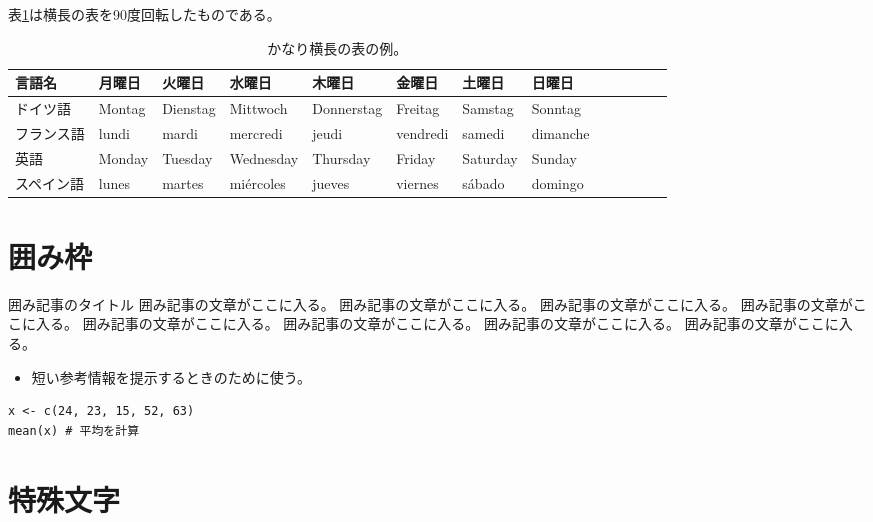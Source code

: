 \documentclass[ %
  uplatex,%
  a5paper,%
  papersize%
]{jsbook}
\newcommand{\sanko}[1]{%
  \begin{itemize}
    \item[\mysbox{\small\gtfamily 参考}] #1
  \end{itemize}
}
\begin{document}
表\ref{tb:wide-table-example}は横長の表を90度回転したものである。

\begin{landscape}
  \begin{table}
    \caption{かなり横長の表の例。}
    \label{tb:wide-table-example}
    \begin{center}
      \begin{tabular}{lllllllllllll} \toprule
        言語名   & 月曜日     & 火曜日      & 水曜日       & 木曜日        & 金曜日       & 土曜日      & 日曜日      \\ \midrule
        ドイツ語  & Montag  & Dienstag & Mittwoch  & Donnerstag & Freitag   & Samstag  & Sonntag  \\
        フランス語 & lundi   & mardi    & mercredi  & jeudi      & vendredi  & samedi   & dimanche \\
        英語    & Monday  & Tuesday  & Wednesday & Thursday   & Friday    & Saturday & Sunday   \\
        スペイン語 & lunes   & martes   & miércoles & jueves     & viernes   & sábado   & domingo  \\ \bottomrule
      \end{tabular}
    \end{center}
  \end{table}
\end{landscape}

\section{囲み枠}

\begin{note}{囲み記事のタイトル}
囲み記事の文章がここに入る。
囲み記事の文章がここに入る。
囲み記事の文章がここに入る。
囲み記事の文章がここに入る。
囲み記事の文章がここに入る。
囲み記事の文章がここに入る。
囲み記事の文章がここに入る。
囲み記事の文章がここに入る。
\end{note}


\sanko{短い参考情報を提示するときのために使う。}

\begin{lstlisting}[caption=簡単なプログラムの例, label=ls:example]
x <- c(24, 23, 15, 52, 63)
mean(x) # 平均を計算
\end{lstlisting}


\section{特殊文字}
\end{document}
